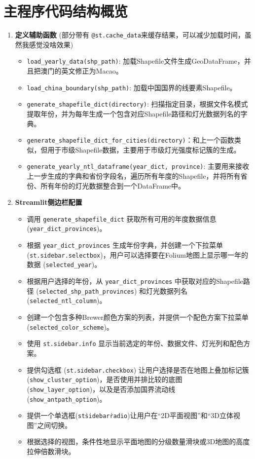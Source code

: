 \documentclass[14pt,a4paper,UTF8,twoside]{article}
\begin{document}
\section{主程序代码结构概览}

\begin{enumerate}

    \item \textbf{定义辅助函数} (部分带有 \texttt{@st.cache\_data}来缓存结果，可以减少加载时间，虽然我感觉没啥效果)
        \begin{itemize}
            \item \texttt{load\_yearly\_data(shp\_path)}: 加载Shapefile文件生成GeoDataFrame，并且把澳门的英文修正为Macao。
            \item \texttt{load\_china\_boundary(shp\_path)}: 加载中国国界的线要素Shapefile。
            \item \texttt{generate\_shapefile\_dict(directory)}: 扫描指定目录，根据文件名模式提取年份，并为每年生成一个包含对应Shapefile路径和灯光数据列名的字典。
            \item \texttt{generate\_shapefile\_dict\_for\_cities(directory)}：和上一个函数类似，但用于市级Shapefile数据，主要用于市级灯光强度标记簇的生成。
            \item \texttt{generate\_yearly\_ntl\_dataframe(year\_dict, province)}: 主要用来接收上一步生成的字典和省份字段名，遍历所有年度的Shapefile，并将所有省份、所有年份的灯光数据整合到一个DataFrame中。
        \end{itemize}
    
    \item \textbf{Streamlit侧边栏配置}
        \begin{itemize}
            \item 调用 \texttt{generate\_shapefile\_dict} 获取所有可用的年度数据信息 (\texttt{year\_dict\_provinces})。
            \item 根据 \texttt{year\_dict\_provinces} 生成年份字典，并创建一个下拉菜单(\texttt{st.sidebar.selectbox})，用户可以选择要在Folium地图上显示哪一年的数据 (\texttt{selected\_year})。
            \item 根据用户选择的年份，从 \texttt{year\_dict\_provinces} 中获取对应的Shapefile路径 (\texttt{selected\_shp\_path\_provinces}) 和灯光数据列名\\ (\texttt{selected\_ntl\_column})。
            \item 创建一个包含多种Brewer颜色方案的列表，并提供一个配色方案下拉菜单 (\texttt{selected\_color\_scheme})。
            \item 使用 \texttt{st.sidebar.info} 显示当前选定的年份、数据文件、灯光列和配色方案。
            \item 提供勾选框 (\texttt{st.sidebar.checkbox}) 让用户选择是否在地图上叠加标记簇 (\texttt{show\_cluster\_option})，是否使用并排比较的底图 (\texttt{show\_layer\_option})，以及是否添加国界流动线 (\texttt{show\_antpath\_option})。
            \item 提供一个单选框(\texttt{st\.sidebar\.radio})让用户在“2D平面视图”和“3D立体视图”之间切换。
            \item 根据选择的视图，条件性地显示平面地图的分级数量滑块或3D地图的高度拉伸倍数滑块。
        \end{itemize}


\end{enumerate}
\end{document}
